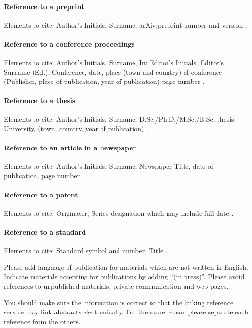 \documentclass{lpaper} %
\begin{document}
\paragraph{Reference to a preprint}
Elements to cite:
Author's Initials. Surname,
arXiv:preprint-number and version \cite{arxiv-1,arxiv-2}.

\paragraph{Reference to a conference proceedings}
Elements to cite:
Author's Initials. Surname,
In: Editor's Initials. Editor's Surname (Ed.),
Conference,
date, place (town and country) of conference
(Publisher, place of publication, year of publication)
page number \cite{proceedings}.


\paragraph{Reference to a thesis}
Elements to cite:
Author's Initials. Surname,
D.Sc./Ph.D./M.Sc./B.Sc. thesis,
University,
(town, country, year of publication) \cite{thesis}.


\paragraph{Reference to an article in a newspaper}
Elements to cite:
Author's Initials. Surname,
Newspaper Title,
date of publication,
page number \cite{newspaper-1,newspaper-2}.


\paragraph{Reference to a patent}
Elements to cite:
Originator,
Series designation which may include full date \cite{patent}.


\paragraph{Reference to a standard}
Elements to cite:
Standard symbol and number,
Title \cite{standard-1,standard-2}.

Please add language of publication for materials which are not written in English. Indicate materials accepting for publications by adding ``(in press)''. Please avoid references to unpublished materials, private communication and web pages.

You should make sure the information is correct so that the linking reference service may link abstracts electronically. For the same reason please separate each reference from the others.
\end{document}
